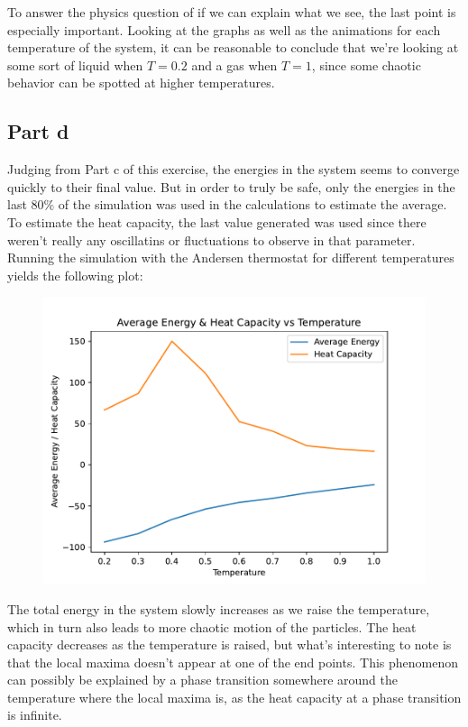 \documentclass[a4paper,12pt]{article}
\begin{document}
To answer the physics question of if we can explain what we see, the last point is especially important. Looking at
the graphs as well as the animations for each temperature of the system, it can be reasonable to conclude that we're
looking at some sort of liquid when $T = 0.2$ and a gas when $T = 1$, since some chaotic behavior can be spotted at
higher temperatures.

\subsection*{Part d}

Judging from Part c of this exercise, the energies in the system seems to converge quickly to their final value. But
in order to truly be safe, only the energies in the last $80\%$ of the simulation was used in the calculations to
estimate the average. To estimate the heat capacity, the last value generated was used since there weren't really any
oscillatins or fluctuations to observe in that parameter. Running the simulation with the Andersen thermostat for
different temperatures yields the following plot:

\begin{figure}[!ht]
  \centering
  \includegraphics[scale=0.49]{img/3_2d_ECvvsT.pdf}
\end{figure}

\FloatBarrier

The total energy in the system slowly increases as we raise the temperature, which in turn also leads to more chaotic
motion of the particles. The heat capacity decreases as the temperature is raised, but what's interesting to note is
that the local maxima doesn't appear at one of the end points. This phenomenon can possibly be explained by a phase
transition somewhere around the temperature where the local maxima is, as the heat capacity at a phase transition is
infinite.
\end{document}
